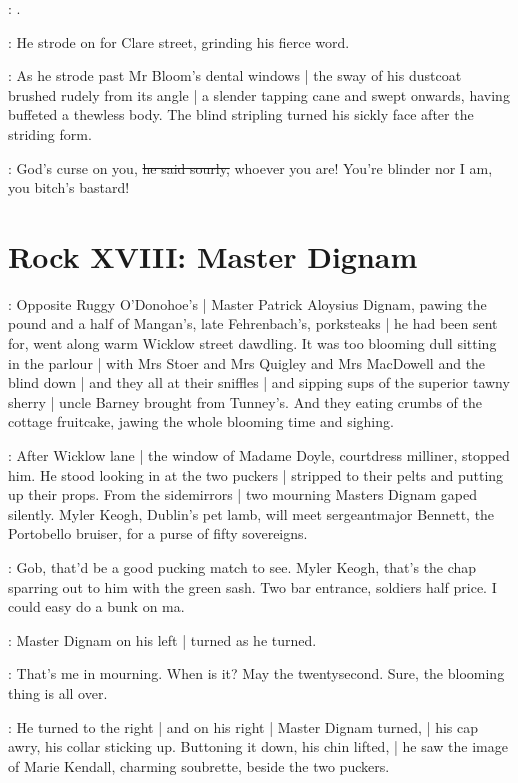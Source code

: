 \cashel:
.

:
He strode on for Clare street,
grinding his fierce word.

:
As he strode past Mr Bloom's dental windows |
the sway of his dustcoat brushed rudely from its angle |
a slender tapping cane and swept onwards,
having buffeted a thewless body.
The blind stripling turned his sickly face after the striding form.

\stripling:
God's curse on you,
\sout{he said sourly,}
whoever you are!
You're blinder nor I am,
you bitch's bastard!


\section*{Rock XVIII: Master Dignam}


:
Opposite Ruggy O'Donohoe's |
Master Patrick Aloysius Dignam,
pawing the pound and a half of Mangan's,
late Fehrenbach's,
porksteaks |
he had been sent for,
went along warm Wicklow street dawdling.
It was too blooming dull sitting in the parlour |
with Mrs Stoer and Mrs Quigley and Mrs MacDowell
and the blind down |
and they all at their sniffles |
and sipping sups of the superior tawny sherry |
uncle Barney brought from Tunney's.
And they eating crumbs of the cottage fruitcake,
jawing the whole blooming time and sighing.

:
After Wicklow lane |
the window of Madame Doyle,
courtdress milliner,
stopped him.
He stood looking in at the two puckers |
stripped to their pelts and putting up their props.
From the sidemirrors |
two mourning Masters Dignam gaped silently.
Myler Keogh,
Dublin's pet lamb,
will meet sergeantmajor Bennett,
the Portobello bruiser,
for a purse of fifty sovereigns.

\masterdignam:
Gob, that'd be a good pucking match to see.
Myler Keogh, that's the chap sparring out to him with the green sash.
Two bar entrance, soldiers half price.
I could easy do a bunk on ma.

:
Master Dignam on his left |
turned as he turned.

\masterdignam:
That's me in mourning.
When is it?
May the twentysecond.
Sure, the blooming thing is all over.

:
He turned to the right |
and on his right |
Master Dignam turned, |
his cap awry,
his collar sticking up.
Buttoning it down,
his chin lifted, |
he saw the image of Marie Kendall,
charming soubrette,
beside the two puckers.

